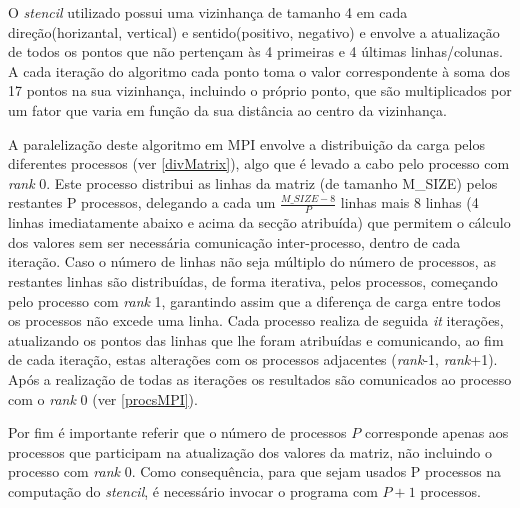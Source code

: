 \documentclass{article}
\begin{document}
O \textit{stencil} utilizado possui uma vizinhança de tamanho 4 em cada direção(horizantal, vertical) e sentido(positivo, negativo) e envolve a atualização de todos os pontos que não pertençam às 4 primeiras 
e 4 últimas linhas/colunas. A cada iteração do algoritmo cada ponto toma o valor correspondente à soma dos 17 pontos na sua vizinhança, incluindo o próprio ponto, 
que são multiplicados por um fator que varia em função da sua distância ao centro da vizinhança.

A paralelização deste algoritmo em MPI envolve a distribuição da carga pelos diferentes processos (ver \ref{divMatrix}), algo que é levado a cabo
pelo processo com \textit{rank} 0. Este processo distribui as linhas da matriz (de tamanho M\_SIZE) pelos restantes P processos, delegando a cada 
um $\frac{M\_SIZE-8}{P}$ linhas mais 8 linhas (4 linhas imediatamente abaixo e acima da secção atribuída) que permitem o cálculo dos valores sem 
ser necessária comunicação inter-processo, dentro de cada iteração. Caso o número de linhas não seja múltiplo do número de processos, as 
restantes linhas são distribuídas, de forma iterativa, pelos processos, começando pelo processo com \textit{rank} 1, garantindo assim que a diferença 
de carga entre todos os processos não excede uma linha. 
Cada processo realiza de seguida \textit{it} iterações, atualizando os pontos das linhas que lhe foram atribuídas e comunicando, ao fim de cada iteração,
estas alterações com os processos adjacentes (\textit{rank}-1, \textit{rank}+1). Após a realização de todas as iterações os resultados são comunicados ao processo com 
o \textit{rank} 0 (ver \ref{procsMPI}).

Por fim é importante referir que o número de processos $P$ corresponde apenas aos processos que participam na atualização dos valores da matriz, não 
incluindo o processo com \textit{rank} 0. Como consequência, para que sejam usados P processos na computação do \textit{stencil}, é necessário invocar
o programa com $P+1$ processos.
\end{document}
